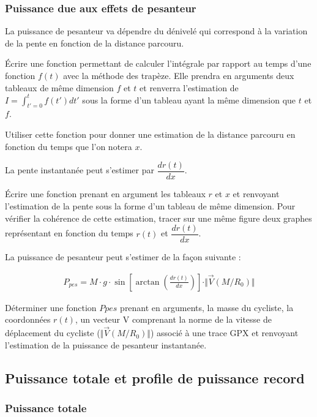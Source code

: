 \subsubsection*{Puissance due aux effets de pesanteur}

La puissance de pesanteur va dépendre du dénivelé qui correspond à la variation de la pente en fonction de la distance parcouru.

\question{} Écrire une fonction permettant de calculer l'intégrale par rapport au temps d'une fonction $f(t)$ avec la méthode des trapèze. Elle prendra en arguments deux tableaux de même dimension $f$ et $t$ et renverra l'estimation de $I=\displaystyle{\int_{t'=0}^t}f(t')dt'$ sous la forme d'un tableau ayant la même dimension que $t$ et $f$.

\question{} Utiliser cette fonction pour donner une estimation de la distance parcouru en fonction du temps que l'on notera $x$.

La pente instantanée peut s'estimer par $\dfrac{dr(t)}{dx}$.

\question{} Écrire une fonction prenant en argument les tableaux $r$ et $x$ et renvoyant l'estimation de la pente sous la forme d'un tableau de même dimension. Pour vérifier la cohérence de cette estimation, tracer sur une même figure deux graphes représentant en fonction du temps $r(t)$ et $\dfrac{dr(t)}{dx}$.

La puissance de pesanteur peut s'estimer de la façon suivante : 

\begin{align*}
P_{pes}=M\cdot g \cdot \sin\left[\arctan\left(\frac{dr(t)}{dx}\right)\right]\cdot \Vert \overrightarrow{V}(M/R_0)\Vert 
\end{align*}

\question{} Déterminer une fonction $Ppes$ prenant en arguments, la masse du cycliste, la coordonnées $r(t)$, un vecteur V comprenant la norme de la vitesse de déplacement du cycliste ($\Vert \overrightarrow{V}(M/R_0)\Vert$) associé à une trace GPX et renvoyant l'estimation de la puissance de pesanteur instantanée.  

\subsection*{Puissance totale et profile de puissance record}

\subsubsection*{Puissance totale}

